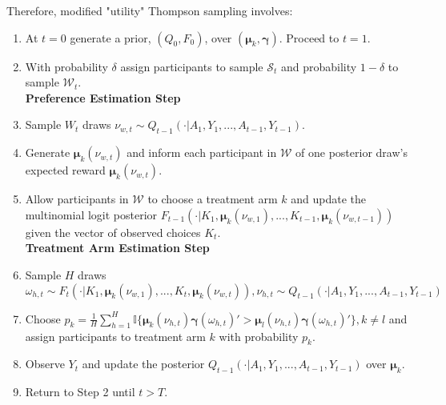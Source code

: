 \documentclass[aspectratio=169,xcolor=dvipsnames]{beamer}
\begin{document}

\begin{frame}{}

    Therefore, modified "utility" Thompson sampling involves:


\begin{enumerate}[<+->]
    \item At $t=0$ generate a prior, $(Q_0, F_0)$, over $(\bm{\mu}_k, \bm{\gamma})$. Proceed to $t=1$.
    \item With probability $\delta$ assign participants to sample $\mathcal{S}_t$ and probability
    $1 - \delta$ to sample $\mathcal{W}_t$.      \\
     \textbf{Preference Estimation Step}
    \item Sample $W_t$ draws $\nu_{w, t} \sim Q_{t-1}(\cdot | A_1, Y_1, ..., A_{t-1}, Y_{t-1})$.
    \item Generate $\bm{\mu}_k(\nu_{w,t})$ and inform each participant in $\mathcal{W}$ 
    of one posterior draw's expected reward $\bm{\mu}_k(\nu_{w,t})$.
    \item Allow participants in $\mathcal{W}$ to choose a treatment arm $k$ and update the 
    multinomial logit posterior $F_{t-1}(\cdot | K_1, \bm{\mu}_k(\nu_{w, 1}), ..., K_{t-1}, \bm{\mu}_k(\nu_{w, t-1}))$ given 
    the vector of observed choices $K_t$.
    \\
    \textbf{Treatment Arm Estimation Step}
    \item Sample $H$ draws $\omega_{h,t} \sim F_{t}(\cdot | K_1, \bm{\mu}_k(\nu_{w, 1}), ..., K_{t}, \bm{\mu}_k(\nu_{w, t})), \nu_{h, t} \sim Q_{t-1}(\cdot | A_1, Y_1, ..., A_{t-1}, Y_{t-1})$
    \item Choose $p_k = \frac{1}{H} \sum^H_{h=1} \mathbb{I}\{\bm{\mu}_k(\nu_{h,t}) \bm{\gamma}(\omega_{h,t})' > \bm{\mu}_l(\nu_{h,t}) \bm{\gamma}(\omega_{h,t})'\}, k \neq l$ and assign 
    participants to treatment arm $k$ with probability $p_k$.
    \item Observe $Y_t$ and update the posterior $Q_{t-1}(\cdot | A_1, Y_1, ..., A_{t-1}, Y_{t-1})$ over $\bm{\mu}_k$. 
    \item Return to Step 2 until $t > T$.
\end{enumerate}


\end{frame}
\end{document}
